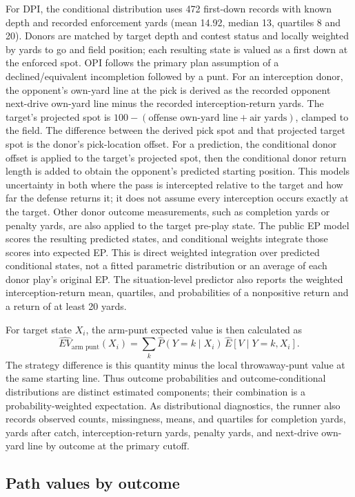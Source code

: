 \documentclass[11pt]{article}
\begin{document}
For DPI, the conditional distribution uses 472 first-down records with known depth and recorded enforcement yards (mean 14.92, median 13, quartiles 8 and 20). Donors are matched by target depth and contest status and locally weighted by yards to go and field position; each resulting state is valued as a first down at the enforced spot. OPI follows the primary plan assumption of a declined/equivalent incompletion followed by a punt. For an interception donor, the opponent's own-yard line at the pick is derived as the recorded opponent next-drive own-yard line minus the recorded interception-return yards. The target's projected spot is \(100-(\text{offense own-yard line}+\text{air yards})\), clamped to the field. The difference between the derived pick spot and that projected target spot is the donor's pick-location offset. For a prediction, the conditional donor offset is applied to the target's projected spot, then the conditional donor return length is added to obtain the opponent's predicted starting position. This models uncertainty in both where the pass is intercepted relative to the target and how far the defense returns it; it does not assume every interception occurs exactly at the target. Other donor outcome measurements, such as completion yards or penalty yards, are also applied to the target pre-play state. The public EP model scores the resulting predicted states, and conditional weights integrate those scores into expected EP. This is direct weighted integration over predicted conditional states, not a fitted parametric distribution or an average of each donor play's original EP. The situation-level predictor also reports the weighted interception-return mean, quartiles, and probabilities of a nonpositive return and a return of at least 20 yards.

For target state \(X_i\), the arm-punt expected value is then calculated as
\[
  \widehat{EV}_{\text{arm punt}}(X_i)
  = \sum_k \widehat{P}(Y=k\mid X_i)\,
    \widehat{E}[V\mid Y=k,X_i].
\]
The strategy difference is this quantity minus the local throwaway-punt value at the same starting line. Thus outcome probabilities and outcome-conditional distributions are distinct estimated components; their combination is a probability-weighted expectation. As distributional diagnostics, the runner also records observed counts, missingness, means, and quartiles for completion yards, yards after catch, interception-return yards, penalty yards, and next-drive own-yard line by outcome at the primary cutoff.

\subsection{Path values by outcome}
\end{document}
